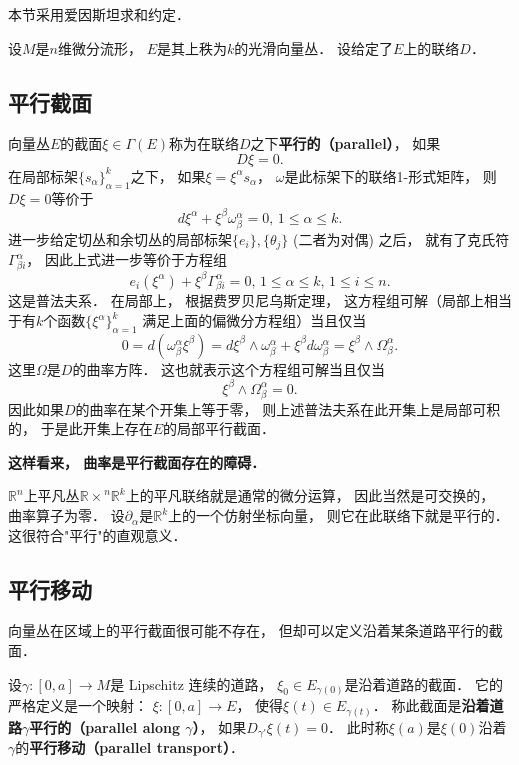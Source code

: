 

本节采用爱因斯坦求和约定．

设$M$是$n$维微分流形， $E$是其上秩为$k$的光滑向量丛． 设给定了$E$上的联络$D$．

\subsection{平行截面}

向量丛$E$的截面$\xi\in\Gamma(E)$称为在联络$D$之下\textbf{平行的（parallel）}， 如果
$$D\xi=0.$$
在局部标架$\{s_\alpha\}_{\alpha=1}^k$之下， 如果$\xi=\xi^\alpha s_\alpha$， $\omega$是此标架下的联络1-形式矩阵， 则$D\xi=0$等价于
$$
d\xi^\alpha+\xi^\beta\omega^\alpha_\beta=0,\,1\leq \alpha\leq k.
$$
进一步给定切丛和余切丛的局部标架$\{e_i\},\{\theta_j\}$ (二者为对偶) 之后， 就有了克氏符$\Gamma_{\beta i}^\alpha$， 因此上式进一步等价于方程组
$$
e_i(\xi^\alpha)+\xi^\beta\Gamma^\alpha_{\beta i}=0,\,1\leq \alpha\leq k,\,1\leq i\leq n.
$$
这是普法夫系． 在局部上， 根据费罗贝尼乌斯定理， 这方程组可解（局部上相当于有$k$个函数$\{\xi^\alpha\}_{\alpha=1}^k$ 满足上面的偏微分方程组）当且仅当
$$
0=d(\omega^\alpha_\beta\xi^\beta)=d\xi^\beta\wedge\omega^\alpha_\beta+\xi^\beta d\omega^\alpha_\beta=\xi^\beta\wedge\Omega_\beta^\alpha.
$$
这里$\Omega$是$D$的曲率方阵． 这也就表示这个方程组可解当且仅当
$$
\xi^\beta\wedge\Omega_\beta^\alpha=0.
$$
因此如果$D$的曲率在某个开集上等于零， 则上述普法夫系在此开集上是局部可积的， 于是此开集上存在$E$的局部平行截面．

\textbf{这样看来， 曲率是平行截面存在的障碍．}

$\mathbb{R}^n$上平凡丛$\mathbb{R\times}^n\mathbb{R}^k$上的平凡联络就是通常的微分运算， 因此当然是可交换的， 曲率算子为零． 设$\partial_\alpha$是$\mathbb{R}^k$上的一个仿射坐标向量， 则它在此联络下就是平行的． 这很符合"平行"的直观意义． 

\subsection{平行移动}
向量丛在区域上的平行截面很可能不存在， 但却可以定义沿着某条道路平行的截面． 

设$\gamma:[0,a]\to M$是 Lipschitz 连续的道路， $\xi_0\in E_{\gamma(0)}$是沿着道路的截面． 它的严格定义是一个映射： $\xi:[0,a]\to E$， 使得$\xi(t)\in E_{\gamma(t)}$． 称此截面是\textbf{沿着道路$\gamma$平行的（parallel along $\gamma$）}， 如果$D_{\gamma'}\xi(t)=0$． 此时称$\xi(a)$是$\xi(0)$沿着$\gamma$的\textbf{平行移动（parallel transport）}．

